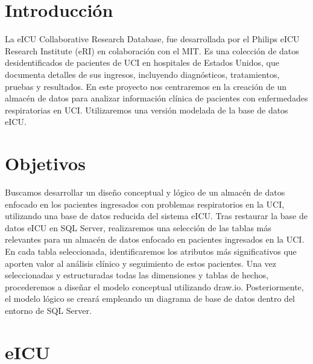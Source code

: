 \documentclass[12pt, a4paper, twoside]{article}
\begin{document}
	
	
	
	\clearpage
	\setcounter{page}{1}
	
	
	
	\tableofcontents
	\newpage
	
	\section{Introducción}
	
	La eICU Collaborative Research Database, fue desarrollada por el Philips eICU Research Institute (eRI) en colaboración con el MIT. Es una colección de datos desidentificados de pacientes de UCI en hospitales de Estados Unidos, que documenta detalles de sus ingresos, incluyendo diagnósticos, tratamientos, pruebas y resultados.
	En este proyecto nos centraremos en la creación de un almacén de datos para analizar información clínica de pacientes con enfermedades respiratorias en UCI. Utilizaremos una versión modelada de la base de datos eICU.
	
	
	\section{Objetivos}
	
	Buscamos desarrollar un diseño conceptual y lógico de un almacén de datos enfocado en los pacientes ingresados con problemas respiratorios en la UCI, utilizando una base de datos reducida del sistema eICU.
	Tras restaurar la base de datos eICU en SQL Server, realizaremos una selección de las tablas más relevantes para un almacén de datos enfocado en pacientes ingresados en la UCI. En cada tabla seleccionada, identificaremos los atributos más significativos que aporten valor al análisis clínico y seguimiento de estos pacientes. Una vez seleccionadas y estructuradas todas las dimensiones y tablas de hechos, procederemos a diseñar el modelo conceptual utilizando draw.io. Posteriormente, el modelo lógico se creará empleando un diagrama de base de datos dentro del entorno de SQL Server.
	
	
	\section{eICU}
	
\end{document}
